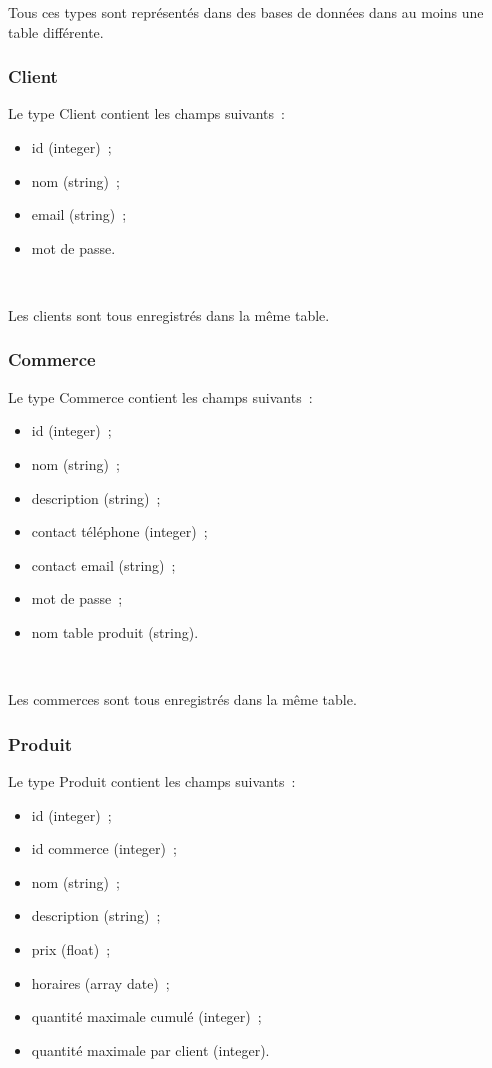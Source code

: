 \documentclass[a4paper,12pt]{article}
\begin{document}
Tous ces types sont représentés dans des bases de données dans au moins une table différente.

\subsubsection{Client}

Le type Client contient les champs suivants~:
\begin{itemize}
	\item id (integer)~;
	\item nom (string)~;
	\item email (string)~;
	\item mot de passe.
\end{itemize} \

Les clients sont tous enregistrés dans la même table.

\subsubsection{Commerce}

Le type Commerce contient les champs suivants~:
\begin{itemize}
	\item id (integer)~;
	\item nom (string)~;
	\item description (string)~;
	\item contact téléphone (integer)~;
	\item contact email (string)~;
	\item mot de passe~;
	\item nom table produit (string).
\end{itemize} \

Les commerces sont tous enregistrés dans la même table.

\subsubsection{Produit}

Le type Produit contient les champs suivants~:
\begin{itemize}
	\item id (integer)~;
	\item id commerce (integer)~;
	\item nom (string)~;
	\item description (string)~;
	\item prix (float)~;
	\item horaires (array date)~;
	\item quantité maximale cumulé (integer)~;
	\item quantité maximale par client (integer).
\end{itemize} \
\end{document}
